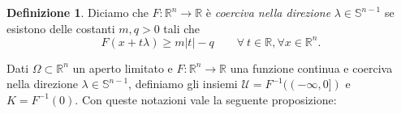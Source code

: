 \documentclass[a4paper,11pt]{book}
\theoremstyle{plain}
\newtheorem{prop}[teo]{Proposizione}
\theoremstyle{definition}
\newtheorem{defn}{Definizione}[chapter]
\theoremstyle{remark}
\newcommand{\R}{\mathbb{R}}
\newcommand{\SP}{\mathbb{S}}
\newcommand{\norm}[1]{\lVert#1\rVert}
\DeclareMathOperator{\clos}{clos}
\DeclareMathOperator{\Lip}{Lip}
\begin{document}
\begin{defn}
	Diciamo che $F:\R^{n}\to\R$ è \textit{coerciva nella direzione} $\lambda\in\SP^{n-1}$ se esistono delle costanti $m,q>0$ tali che
	\[
		F(x+t\lambda)\geq m|t|-q\qquad \forall\ t\in\R, \forall x\in\R^{n}.
	\]
\end{defn}
Dati $\Omega\subset \R^{n}$ un aperto limitato e $F:\R^{n}\to \R$ una funzione continua e coerciva nella direzione $\lambda\in\SP^{n-1}$, definiamo gli insiemi $\mathcal{U}=F^{-1}((-\infty,0])$ e $K=F^{-1}(0)$. Con queste notazioni vale la seguente proposizione:
\begin{comment}
\begin{prop}
	Sia $\phi:\Omega\to\R$ una funzione affine tale che $F(D\phi)\leq 0$. Allora per ogni funzione $f$ nell'insieme
	\[
		S=\Lip(\Omega)\cap \clos_{\infty}(\mathscr{P}(\Omega,\mathcal{U},\phi))
	\]
	e per ogni $\epsilon >0$ esiste $g\in\Lip(\Omega)$ tale che $Dg\in K$ quasi ovunque in $\Omega$ e $\norm{f-g}_{\infty}<\epsilon$.
\end{prop}
\begin{proof}
	Senza perdita di generalità possiamo supporre che $\lambda=(1,0,\ldots,0)\in\R^{n}$. L'idea è applicare la Proposizione \ref{prop:3}, ma non la possiamo usare direttamente con gli insiemi $\mathcal{U}$ e $K$ definiti nell'enunciato perché quando abbiamo definito la stabilità vicino ad un certo insieme richiedevamo che $\mathcal{U}$ fosse limitato.\\
	Osserviamo subito un fatto: se $f\in S$ allora esiste $M>0$ tale che, detto $\hat{\mathcal{U}}=[-M,M]^{n}\cap\mathcal{U}$, accade che $f\in\clos_{\infty}(\mathscr{P}(\Omega,\hat{\mathcal{U}},\phi))$. Infatti sia $\{f_{k}\}\subset\mathscr{P}(\Omega,\mathcal{U},\phi)$ una successione tale che $\norm{f_{k}-f}_{\infty}\to0$, allora $\forall x,y\in\Omega$
	\[
		\norm{f_{k}(x)-f_{k}(y)}\leq \norm{f_{k}(x)-f(x)}+\norm{f(x)-f(y)}+\norm{f(y)-f_{k}(y)},
	\]
	detta $M=\Lip(f)$, prendiamo $k$ sufficientemente grande affinché $\norm{f_{k}-f}_{\infty}<1/2$, così otteniamo che $\norm{f_{k}(x)-f_{k}(y)}<M+1$, dunque definitivamente $\Lip(f_{k})<M+1$.\\
	Possiamo quindi troncare $\mathcal{U}$ e $K$ in modo opportuno: prendiamo $M>0$ abbastanza grande affinché accada che $D\phi\in [-M,M]^{n}\cap \mathcal{U}$, $mM-q>0$ ($m$ e $q$ sono quelli della definizione di coercività) e che, con la notazione di prima, $f\in\clos_{\infty}(\mathscr{P}(\Omega,\hat{\mathcal{U}},\phi))$, vedremo poi che questo basterà per il nostro scopo.\\

\end{comment}
\end{document}
